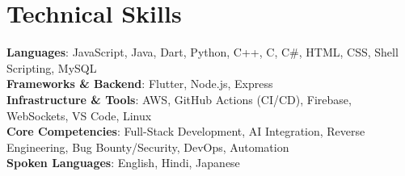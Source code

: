 \documentclass[letterpaper,11pt]{article}
\begin{document}
\section{Technical Skills}
 \begin{itemize}[leftmargin=0.15in, label={}]
    \small{\item{
     \textbf{Languages}{: JavaScript, Java, Dart, Python, C++, C, C\#, HTML, CSS, Shell Scripting, MySQL} \\
     \textbf{Frameworks \& Backend}{: Flutter, Node.js, Express} \\
     \textbf{Infrastructure \& Tools}{: AWS, GitHub Actions (CI/CD), Firebase, WebSockets, VS Code, Linux} \\
     \textbf{Core Competencies}{: Full-Stack Development, AI Integration, Reverse Engineering, Bug Bounty/Security, DevOps, Automation} \\
     \textbf{Spoken Languages}{: English, Hindi, Japanese}
    }}
 \end{itemize}


\end{document}
